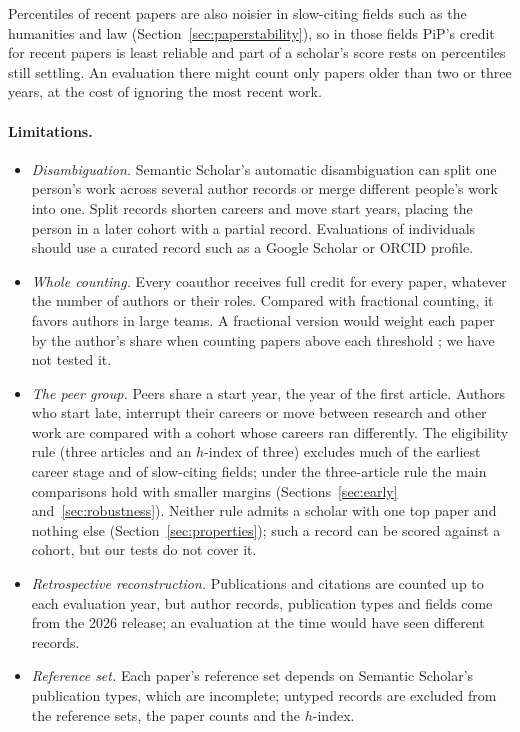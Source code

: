 \documentclass[11pt]{article}
\begin{document}
Percentiles of recent papers are also noisier in slow-citing fields such as the humanities and law
(Section~\ref{sec:paperstability}), so in those fields PiP's credit for recent papers is least reliable and part of a
scholar's score rests on percentiles still settling. An evaluation there might count only papers older than two or
three years, at the cost of ignoring the most recent work.

\paragraph{Limitations.}
\begin{itemize}
  \item \emph{Disambiguation.} Semantic Scholar's automatic disambiguation can split one person's work across several
  author records or merge different people's work into one. Split records shorten careers and move start years,
  placing the person in a later cohort with a partial record. Evaluations of individuals should use a curated record
  such as a Google Scholar or ORCID profile.
  \item \emph{Whole counting.} Every coauthor receives full credit for every paper, whatever the number of authors or
  their roles. Compared with fractional counting, it favors authors in large teams. A fractional version would weight
  each paper by the author's share when counting papers above each threshold \citep{waltman2015field}; we have not
  tested it.
  \item \emph{The peer group.} Peers share a start year, the year of the first article. Authors who start late,
  interrupt their careers or move between research and other work are compared with a cohort whose careers ran
  differently. The eligibility rule (three articles and an $h$-index of three) excludes much of the earliest career
  stage and of slow-citing fields; under the three-article rule the main comparisons hold with smaller margins
  (Sections~\ref{sec:early} and~\ref{sec:robustness}). Neither rule admits a scholar with one top paper and nothing else
  (Section~\ref{sec:properties}); such a record can be scored against a cohort, but our tests do not cover it.
  \item \emph{Retrospective reconstruction.} Publications and citations are counted up to each evaluation year, but
  author records, publication types and fields come from the 2026 release; an evaluation at the time would have seen
  different records.
  \item \emph{Reference set.} Each paper's reference set depends on Semantic Scholar's publication types, which are
  incomplete; untyped records are excluded from the reference sets, the paper counts and the $h$-index.
\end{itemize}
\end{document}
